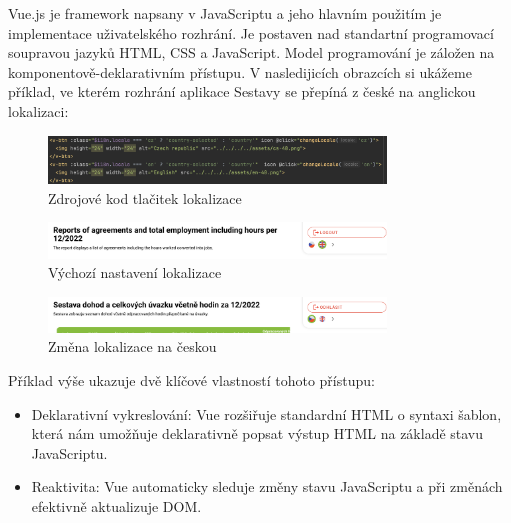\documentclass[12pt]{article}
\begin{document}
Vue.js je framework napsany v JavaScriptu a jeho hlavním použitím je implementace uživatelského rozhrání. 
Je postaven nad standartní programovací soupravou jazyků HTML, CSS a JavaScript. 
Model programování je záložen na komponentově-deklarativním přístupu. V nasledijicích obrazcích si ukážeme příklad, 
ve kterém rozhrání aplikace Sestavy se přepíná z české na anglickou lokalizaci: 
\begin{figure}[H]
    \centering
    \includegraphics[width=0.8\textwidth]{images/_lokalizace.png}
    \caption{Zdrojové kod tlačitek lokalizace}
\end{figure}
\begin{figure}[H]
    \centering
    \includegraphics[width=0.8\textwidth]{images/en_lokalizace.png}
    \caption{Výchozí nastavení lokalizace}
\end{figure}
\begin{figure}[H]
    \centering
    \includegraphics[width=0.8\textwidth]{images/cz_lokalizace.png}
    \caption{Změna lokalizace na českou}
\end{figure}
Příklad výše ukazuje dvě klíčové vlastností tohoto přístupu:
\begin{itemize}
    \item Deklarativní vykreslování: Vue rozšiřuje standardní HTML o syntaxi šablon, která nám umožňuje deklarativně popsat výstup HTML na základě stavu JavaScriptu.
    \item Reaktivita: Vue automaticky sleduje změny stavu JavaScriptu a při změnách efektivně aktualizuje DOM.
\end{itemize}
\end{document}
